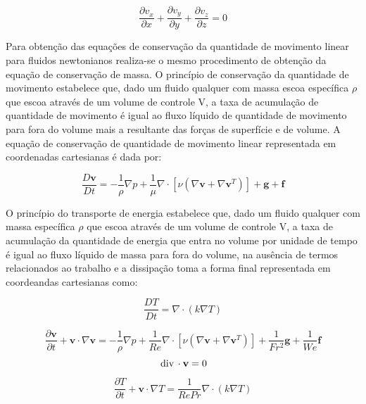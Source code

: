 \documentclass[a4paper,portuges]{article}
\newcommand{\diverg}{{\,\rm div}\,}
\newcommand{\vvet}{\mathbf{v}}
\begin{document}
\begin{equation}
	\frac{\partial v_x}{\partial x} +
	\frac{\partial v_y}{\partial y} +
	\frac{\partial v_z}{\partial z}  
	= 
	0
	\label{eq:cm9}
\end{equation}

Para obtenção das equações de conservação da quantidade de movimento
linear para fluidos newtonianos realiza-se o mesmo procedimento de
obtenção da equação de conservação de massa. O princípio de conservação
da quantidade de movimento estabelece que, dado um fluido qualquer com
massa escoa específica $\rho$ que escoa através de um volume de controle
V, a taxa de acumulação de quantidade de movimento é igual ao fluxo
líquido de quantidade de movimento para fora do volume mais a resultante
das forças de superfície e de volume. A equação de conservação de
quantidade de movimento linear representada em coordenadas cartesianas é
dada por:

\begin{equation}
	\frac{D \vvet}{D t} = - \frac{1}{\rho} \nabla p +
	\frac{1}{\mu} \nabla \cdot [\nu(\nabla \vvet + \nabla \vvet^T)] + 
	\textbf{g} + 
	\textbf{f}
\label{eq:NS3a}
\end{equation}

O princípio do transporte de energia estabelece que, dado um
fluido qualquer com massa específica $\rho$ que escoa através de um
volume de controle V, a taxa de acumulação da quantidade de energia
que entra no volume por unidade de tempo é igual ao fluxo
líquido de massa para fora do volume, na ausência de termos relacionados
ao trabalho e a dissipação toma a forma final representada em
coordeandas cartesianas como:

\begin{equation}
	\frac{DT}{Dt} =  \nabla \cdot (k \nabla T)
\label{eq:quimica2}
\end{equation}\vspace{0.5cm}


	\begin{equation}
		\frac{\partial \vvet}{\partial t} + \vvet \cdot \nabla \vvet
		=
		-\frac{1}{\rho} \nabla p + \frac{1}{Re} \nabla \cdot
		[\nu ( \nabla \vvet + \nabla \vvet^T)]+
		\frac{1}{Fr^2} \mathbf{g} + 
		\frac{1}{We} \mathbf{f}
		\label{eq:final1}
	\end{equation}
	\begin{equation}
		\diverg \cdot \vvet = 0
		\label{eq:final2} 
	\end{equation}	
	\begin{equation}
		\frac{\partial T}{\partial t} + \vvet \cdot \nabla T
		=
		\frac{1}{RePr} \nabla \cdot (k \nabla T)
		\label{eq:final3}
	\end{equation}\vspace{0.5cm}
\end{document}

